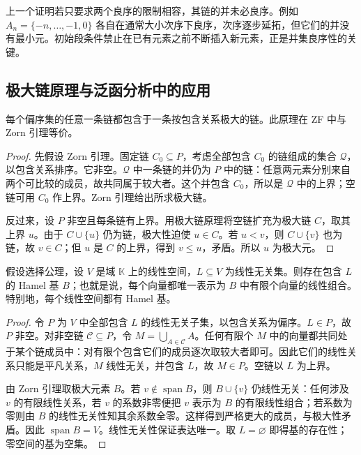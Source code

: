 \begin{remark}[为什么需要初始段条件]
上一个证明若只要求两个良序的限制相容，其链的并未必良序。例如 $A_n=\{-n,\ldots,-1,0\}$ 各自在通常大小次序下良序，次序逐步延拓，但它们的并没有最小元。初始段条件禁止在已有元素之前不断插入新元素，正是并集良序性的关键。
\end{remark}

\subsection{极大链原理与泛函分析中的应用}
\begin{theorem}\label{thm:y0-maximal-chain}
每个偏序集的任意一条链都包含于一条按包含关系极大的链。此原理在 ZF 中与 Zorn 引理等价。
\end{theorem}
\begin{proof}
先假设 Zorn 引理。固定链 $C_0\subseteq P$，考虑全部包含 $C_0$ 的链组成的集合 $\mathcal Q$，以包含关系排序。它非空。$\mathcal Q$ 中一条链的并仍为 $P$ 中的链：任意两元素分别来自两个可比较的成员，故共同属于较大者。这个并包含 $C_0$，所以是 $\mathcal Q$ 中的上界；空链可用 $C_0$ 作上界。Zorn 引理给出所求极大链。

反过来，设 $P$ 非空且每条链有上界。用极大链原理将空链扩充为极大链 $C$，取其上界 $u$。由于 $C\cup\{u\}$ 仍为链，极大性迫使 $u\in C$。若 $u<v$，则 $C\cup\{v\}$ 也为链，故 $v\in C$；但 $u$ 是 $C$ 的上界，得到 $v\le u$，矛盾。所以 $u$ 为极大元。
\end{proof}

\begin{theorem}\label{thm:y0-hamel-basis}
假设选择公理，设 $V$ 是域 $\mathbb K$ 上的线性空间，$L\subseteq V$ 为线性无关集。则存在包含 $L$ 的 Hamel 基 $B$；也就是说，每个向量都唯一表示为 $B$ 中有限个向量的线性组合。特别地，每个线性空间都有 Hamel 基。
\end{theorem}
\begin{proof}
令 $P$ 为 $V$ 中全部包含 $L$ 的线性无关子集，以包含关系为偏序。$L\in P$，故 $P$ 非空。对非空链 $\mathcal C\subseteq P$，令 $M=\bigcup_{A\in\mathcal C}A$。任何有限个 $M$ 中的向量都共同处于某个链成员中：对有限个包含它们的成员逐次取较大者即可。因此它们的线性关系只能是平凡关系，$M$ 线性无关，并包含 $L$，故 $M\in P$。空链以 $L$ 为上界。

由 Zorn 引理取极大元素 $B$。若 $v\notin\operatorname{span}B$，则 $B\cup\{v\}$ 仍线性无关：任何涉及 $v$ 的有限线性关系，若 $v$ 的系数非零便把 $v$ 表示为 $B$ 的有限线性组合；若系数为零则由 $B$ 的线性无关性知其余系数全零。这样得到严格更大的成员，与极大性矛盾。因此 $\operatorname{span}B=V$。线性无关性保证表达唯一。取 $L=\varnothing$ 即得基的存在性；零空间的基为空集。
\end{proof}

